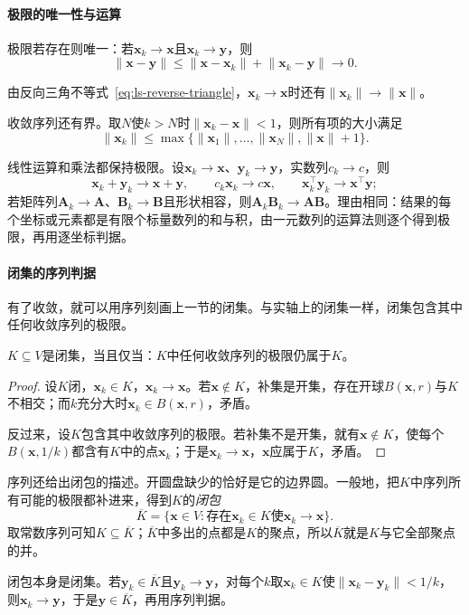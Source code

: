 \paragraph{极限的唯一性与运算}
极限若存在则唯一：若$\bm x_k\to\bm x$且$\bm x_k\to\bm y$，则
\[
 \lVert\bm x-\bm y\rVert\leq\lVert\bm x-\bm x_k\rVert+\lVert\bm x_k-\bm y\rVert\to0.
\]

由反向三角不等式~\eqref{eq:ls-reverse-triangle}，$\bm x_k\to\bm x$时还有$\lVert\bm x_k\rVert\to\lVert\bm x\rVert$。

收敛序列还有界。取$N$使$k>N$时$\lVert\bm x_k-\bm x\rVert<1$，则所有项的大小满足
\[
 \lVert\bm x_k\rVert\leq\max\{\lVert\bm x_1\rVert,\ldots,\lVert\bm x_N\rVert,\lVert\bm x\rVert+1\}.
\]

线性运算和乘法都保持极限。设$\bm x_k\to\bm x$、$\bm y_k\to\bm y$，实数列$c_k\to c$，则
\[
 \bm x_k+\bm y_k\to\bm x+\bm y,\qquad c_k\bm x_k\to c\bm x,\qquad\bm x_k^\top\bm y_k\to\bm x^\top\bm y;
\]
若矩阵列$\bm A_k\to\bm A$、$\bm B_k\to\bm B$且形状相容，则$\bm A_k\bm B_k\to\bm A\bm B$。理由相同：结果的每个坐标或元素都是有限个标量数列的和与积，由一元数列的运算法则逐个得到极限，再用逐坐标判据。

\paragraph{闭集的序列判据}
有了收敛，就可以用序列刻画上一节的闭集。与实轴上的闭集一样，闭集包含其中任何收敛序列的极限。
\begin{lemma}[闭集的序列判据]
\label{lem:multivariable-closed-sequence}
$K\subseteq V$是闭集，当且仅当：$K$中任何收敛序列的极限仍属于$K$。
\end{lemma}
\begin{proof}
设$K$闭，$\bm x_k\in K$，$\bm x_k\to\bm x$。若$\bm x\notin K$，补集是开集，存在开球$B(\bm x,r)$与$K$不相交；而$k$充分大时$\bm x_k\in B(\bm x,r)$，矛盾。

反过来，设$K$包含其中收敛序列的极限。若补集不是开集，就有$\bm x\notin K$，使每个$B(\bm x,1/k)$都含有$K$中的点$\bm x_k$；于是$\bm x_k\to\bm x$，$\bm x$应属于$K$，矛盾。
\end{proof}

序列还给出闭包的描述。开圆盘缺少的恰好是它的边界圆。一般地，把$K$中序列所有可能的极限都补进来，得到$K$的\emph{闭包}
\[
 \overline K=\{\bm x\in V:\text{存在}\bm x_k\in K\text{使}\bm x_k\to\bm x\}.
\]
取常数序列可知$K\subseteq\overline K$；$\overline K$中多出的点都是$K$的聚点，所以$\overline K$就是$K$与它全部聚点的并。

闭包本身是闭集。若$\bm y_k\in\overline K$且$\bm y_k\to\bm y$，对每个$k$取$\bm x_k\in K$使$\lVert\bm x_k-\bm y_k\rVert<1/k$，则$\bm x_k\to\bm y$，于是$\bm y\in\overline K$，再用序列判据。

